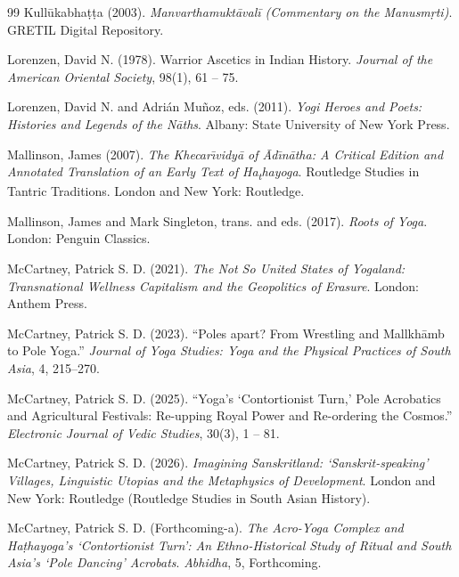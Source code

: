 \documentclass[11pt,twoside,letterpaper]{article}
\begin{document}
\begin{thebibliography}{99}
Kull\={u}kabha\d{t}\d{t}a (2003). \textit{Manvarthamukt\={a}val\={i} (Commentary on the Manusm\d{r}ti)}. GRETIL Digital Repository.

Lorenzen, David N. (1978). Warrior Ascetics in Indian History. \textit{Journal of the American Oriental Society}, 98(1), 61 -- 75.

Lorenzen, David N. and Adrián Mu\~{n}oz, eds. (2011). \textit{Yogi Heroes and Poets: Histories and Legends of the N\={a}ths}. Albany: State University of New York Press.

Mallinson, James (2007). \textit{The Khecar\={\i}vidy\={a} of \={A}d\={\i}n\={a}tha: A Critical Edition and Annotated Translation of an Early Text of Ha\textsubscript{t}hayoga}. Routledge Studies in Tantric Traditions. London and New York: Routledge.

Mallinson, James and Mark Singleton, trans. and eds. (2017). \textit{Roots of Yoga}. London: Penguin Classics.

McCartney, Patrick S. D. (2021). \textit{The Not So United States of Yogaland: Transnational Wellness Capitalism and the Geopolitics of Erasure}. London: Anthem Press.

McCartney, Patrick S. D. (2023). ``Poles apart? From Wrestling and Mallkh\={a}mb to Pole Yoga.'' \textit{Journal of Yoga Studies: Yoga and the Physical Practices of South Asia}, 4, 215–270.

McCartney, Patrick S. D. (2025). ``Yoga's `Contortionist Turn,' Pole Acrobatics and Agricultural Festivals: Re-upping Royal Power and Re-ordering the Cosmos.'' \textit{Electronic Journal of Vedic Studies}, 30(3), 1 -- 81.

McCartney, Patrick S. D. (2026). \textit{Imagining Sanskritland: `Sanskrit-speaking' Villages, Linguistic Utopias and the Metaphysics of Development}. London and New York: Routledge (Routledge Studies in South Asian History).

McCartney, Patrick S. D. (Forthcoming-a). \textit{The Acro-Yoga Complex and Ha\d{t}hayoga's `Contortionist Turn': An Ethno-Historical Study of Ritual and South Asia's `Pole Dancing' Acrobats}. \textit{Abhidha}, 5, Forthcoming.


\end{thebibliography}
\end{document}

